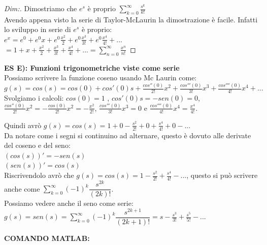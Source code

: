 \begin{proof}[Dim:] Dimostriamo che $ e^{s} $ è proprio $\sum_{k=0}^\infty \frac{s^{k}}{k!} $\\ 
	Avendo appena visto la serie di Taylor-McLaurin la dimostrazione è facile. Infatti lo sviluppo in serie di $ e^{s} $ è proprio:\\
	$ e^{x} = e^0 + e^0 x + e^0 \frac{x^2}{2} + e^0 \frac{x^3}{3!} + e^0 \frac{x^4}{4!} +... $ \\
	$ = 1 + x + \frac{x^2}{2} + \frac{x^3}{3!} + \frac{x^4}{4!}+... = \sum_{n=0}^\infty \frac{x^{n}}{n!}$ 
\end{proof}


\textbf{ES E): Funzioni trigonometriche viste come serie}\\
Possiamo scrivere la funzione coseno usando Mc Laurin come:\\
$ g(s) = cos(s) = cos(0) + cos'(0)s + \frac{ cos''(0)}{2!} x^2 + \frac{ cos'''(0)}{3!} x^3 + \frac{ cos''''(0)}{4!} x^4 + ... $\\

Svolgiamo i calcoli: $ cos(0) = 1$ , $ cos'(0)s = -sen(0) = 0 $, $\frac{ cos''(0)}{2!} x^2 = - \frac{ cos(0)}{2!} x^2 = - \frac{ x^2}{2!}$, $ \frac{ cos'''(0)}{3!} x^3 = 0 $ e $ \frac{ cos''''(0)}{4!} x^4 = \frac{ x^4}{4!} $.

Quindi avrò $ g(s) = cos(s) = 1 + 0 - \frac{s^2}{2!} + 0 + \frac{s^4}{4!} + 0 -... $\\


Da notare come i segni si continuino ad alternare, questo è dovuto alle derivate del coseno e del seno:\\
$ (cos(s))' = - sen(s)$\\
$ (sen(s))' = cos(s)$\\

Riscrivendolo avrò che $  g(s) = cos(s) = 1 - \frac{s^2}{2!} + \frac{s^4}{4!} -...$, questo si può scrivere anche come $ \sum_{k=0}^\infty (-1)^k \dfrac{s^{2k}}{(2k)!}$. \\

Possiamo vedere anche il seno come serie:\\
$ g(s)=sen(s)= \sum_{k=0}^\infty (-1)^k \dfrac{s^{2k+1}}{(2k+1)!} = s - \frac{s^3}{3!}+\frac{s^5}{5!}-...$

\textbf{COMANDO MATLAB:}\\

